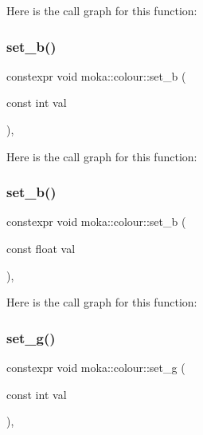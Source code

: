 Here is the call graph for this function\+:
\mbox{\label{classmoka_1_1colour_a7cf8baff4073bf0ad69103cd663d6972}} 
\subsubsection{\texorpdfstring{set\_b()}{set\_b()}\hspace{0.1cm}{\footnotesize\ttfamily [1/2]}}
{\footnotesize\ttfamily constexpr void moka\+::colour\+::set\+\_\+b (\begin{DoxyParamCaption}\item[{const int}]{val }\end{DoxyParamCaption})\hspace{0.3cm}{\ttfamily [inline]}, {\ttfamily [noexcept]}}

Here is the call graph for this function\+:
\mbox{\label{classmoka_1_1colour_a60b29bebff89e6507b5af40d8cc8ffb5}} 
\subsubsection{\texorpdfstring{set\_b()}{set\_b()}\hspace{0.1cm}{\footnotesize\ttfamily [2/2]}}
{\footnotesize\ttfamily constexpr void moka\+::colour\+::set\+\_\+b (\begin{DoxyParamCaption}\item[{const float}]{val }\end{DoxyParamCaption})\hspace{0.3cm}{\ttfamily [inline]}, {\ttfamily [noexcept]}}

Here is the call graph for this function\+:
\mbox{\label{classmoka_1_1colour_ad5e756d118fe5d7fddca8fba8d826b0a}} 
\subsubsection{\texorpdfstring{set\_g()}{set\_g()}\hspace{0.1cm}{\footnotesize\ttfamily [1/2]}}
{\footnotesize\ttfamily constexpr void moka\+::colour\+::set\+\_\+g (\begin{DoxyParamCaption}\item[{const int}]{val }\end{DoxyParamCaption})\hspace{0.3cm}{\ttfamily [inline]}, {\ttfamily [noexcept]}}

